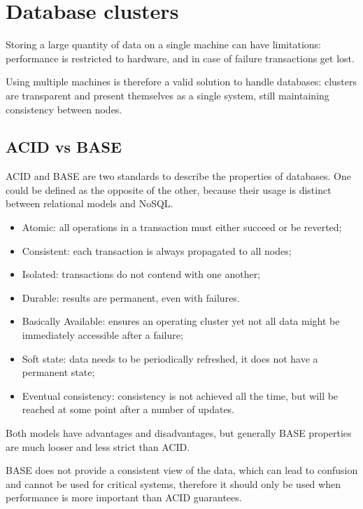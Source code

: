 \section{Database clusters}
Storing a large quantity of data on a single machine can have limitations: performance is restricted to hardware, and in case of failure transactions get lost. 

Using multiple machines is therefore a valid solution to handle databases: clusters are transparent and present themselves as a single system, still maintaining consistency between nodes. 

\subsection{ACID vs BASE}
ACID and BASE are two standards to describe the properties of databases. One could be defined as the opposite of the other, because their usage is distinct between relational models and NoSQL.

\begin{itemize}
	\item Atomic: all operations in a transaction must either succeed or be reverted;
	\item Consistent: each transaction is always propagated to all nodes;
	\item Isolated: transactions do not contend with one another;
	\item Durable: results are permanent, even with failures.
\end{itemize}

\begin{itemize}
	\item Basically Available: ensures an operating cluster yet not all data might be immediately accessible after a failure;
	\item Soft state: data needs to be periodically refreshed, it does not have a permanent state;
	\item Eventual consistency: consistency is not achieved all the time, but will be reached at some point after a number of updates.
\end{itemize}

Both models have advantages and disadvantages, but generally BASE properties are much looser and less strict than ACID. 

BASE does not provide a consistent view of the data, which can lead to confusion and cannot be used for critical systems, therefore it should only be used when performance is more important than ACID guarantees.


